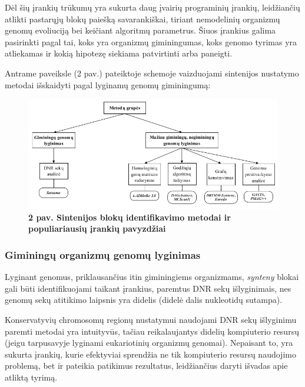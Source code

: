 \documentclass[12pt]{article}
\begin{document}
Dėl šių įrankių trūkumų yra sukurta daug įvairių programinių įrankių,
leidžiančių atlikti pastarųjų blokų paiešką savarankiškai, tiriant nemodelinių
organizmų genomų evoliuciją bei keičiant algoritmų parametrus. Šiuos įrankius
galima pasirinkti pagal tai, koks yra organizmų giminingumas, koks genomo
tyrimas yra atliekamas ir kokią hipotezę siekiama patvirtinti arba paneigti.

Antrame paveiksle (2 pav.) pateiktoje schemoje vaizduojami sintenijos nustatymo
metodai išskaidyti pagal lyginamų genomų giminingumą:

\begin{figure}[htb]
    \begin{center}
        \includegraphics[width=0.9\linewidth]{../Figures/Methods_tools.png}
        \vspace{-2\baselineskip}
        \caption*{\small\textbf{2 pav. Sintenijos blokų identifikavimo
        metodai ir populiariausių įrankių pavyzdžiai}}
        \label{fig:birds}
    \end{center}
\end{figure}

\subsubsection{Giminingų organizmų genomų lyginimas}
Lyginant genomus, priklausančius itin giminingiems organizmams, \emph{synteny}
blokai gali būti identifikuojami taikant įrankius, paremtus DNR sekų
išlyginimais, nes genomų sekų atitikimo laipsnis yra didelis (didelė dalis
nukleotidų sutampa).

Konservatyvių chromosomų regionų nustatymui naudojami DNR sekų išlyginimu
paremti metodai yra intuityvūs, tačiau reikalaujantys didelių kompiuterio
resursų (jeigu tarpusavyje lyginami eukariotinių organizmų genomai). Nepaisant
to, yra sukurta įrankių, kurie efektyviai sprendžia ne tik kompiuterio resursų
naudojimo problemą, bet ir pateikia patikimus rezultatus, leidžiančius daryti
išvadas apie atliktą tyrimą.
\end{document}
